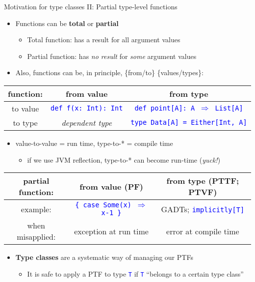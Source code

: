 \documentclass[english]{beamer}
\providecommand{\tabularnewline}{\\}
\begin{document}
\begin{frame}{Motivation for type classes II: Partial type-level functions}

\begin{itemize}
\item Functions can be \textbf{total} or \textbf{partial}
\begin{itemize}
\item Total function: has a result for all argument values
\item Partial function: has \emph{no result} for \emph{some} argument values
\end{itemize}
\item Also, functions can be, in principle, \{from/to\} \{values/types\}:
\end{itemize}
\begin{center}
\begin{tabular}{|c|c|c|}
\hline 
function: &
from value &
from type\tabularnewline
\hline 
\hline 
to value &
\texttt{\textcolor{blue}{\footnotesize{}def f(x:\ Int):\ Int}} &
\texttt{\textcolor{blue}{\footnotesize{}def point{[}A{]}: A $\Rightarrow$
List{[}A{]}}}\tabularnewline
\hline 
to type &
\emph{dependent type} &
\texttt{\textcolor{blue}{\footnotesize{}type Data{[}A{]} = Either{[}Int,
A{]}}}\tabularnewline
\hline 
\end{tabular}
\par\end{center}
\begin{itemize}
\item value-to-value = run time, type-to-{*} = compile time
\begin{itemize}
\item if we use JVM reflection, type-to-{*} can become run-time (\emph{yuck!})
\end{itemize}
\end{itemize}
\begin{center}
\begin{tabular}{|c|c|c|}
\hline 
partial function: &
from value (PF) &
from type (PTTF; PTVF)\tabularnewline
\hline 
\hline 
example: &
\texttt{\textcolor{blue}{\footnotesize{}\{ case Some(x) $\Rightarrow$
x-1 \}}} &
GADTs; \texttt{\textcolor{blue}{\footnotesize{}implicitly{[}T{]}}}\tabularnewline
\hline 
when misapplied: &
exception at run time &
error at compile time\tabularnewline
\hline 
\end{tabular}
\par\end{center}
\begin{itemize}
\item \textbf{Type classes} are a systematic way of managing our PTFs
\begin{itemize}
\item It is safe to apply a PTF to type \texttt{\textcolor{blue}{\footnotesize{}T}}
if \texttt{\textcolor{blue}{\footnotesize{}T}} ``belongs to a certain
type class''
\end{itemize}
\end{itemize}
\end{frame}
\end{document}
